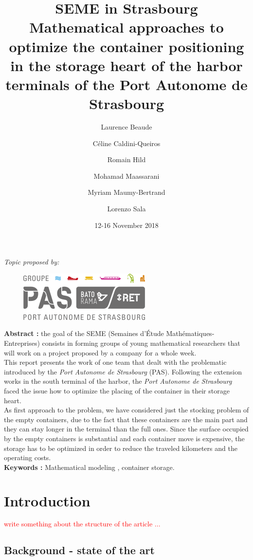 \documentclass{article}
\title{\textbf{SEME in Strasbourg}\\[15pt] 
	Mathematical approaches to optimize the container positioning in the storage heart of the harbor terminals of the Port Autonome de Strasbourg}
\author[1]{Laurence Beaude}
\author[2]{Céline Caldini-Queiros }
\author[2]{Romain Hild}
\author[2]{Mohamad Maassarani}
\author[2]{Myriam Maumy-Bertrand}
\author[2]{Lorenzo Sala}
\affil[1]{Universit\'e C\^ote d'Azur, CNRS, INRIA COFFEE, 
	Laboratoire J.A. Dieudonn\'e, 
	Parc Valrose, 06108 Nice cedex 02, France.}
\affil[2]{Universit\'e de Strasbourg, IRMA, UMR 7501, 67000 Strasbourg, France.}
\date{12-16 November 2018}
\newcommand{\ls}[1]{\textcolor{red}{#1}}
\newcommand{\PAS}{\emph{Port Autonome de Strasbourg }}
\begin{document}
\maketitle

\begin{center}
\textit{Topic proposed by:} \vspace{-3mm}
\begin{figure}[h!]
	\centering
	\includegraphics[width=0.3\linewidth]{images/logo-pas}
\end{figure}
\end{center}

\noindent
\textbf{Abstract :} the goal of the SEME (Semaines d'\'Etude Mathématiques-Entreprises) consists in forming groups of young mathematical researchers that will work on a project proposed by a company for a whole week. \\
This report presents the work of one team that dealt with the problematic introduced by the \PAS (PAS).
Following the extension works in the south terminal of the harbor, the \PAS faced the issue how to optimize the placing of the container in their storage heart. \\
As first approach to the problem, we have considered just the stocking problem of the empty containers, due to the fact that these containers are the main part and they can stay longer in the terminal than the full ones.
Since the surface occupied by the empty containers is substantial and each container move is expensive, the storage has to be optimized in order to reduce the traveled kilometers and the operating costs. \\

\noindent
\textbf{Keywords :} Mathematical modeling , container storage.

\section{Introduction}

\ls{write something about the structure of the article ... }

\subsection{Background - state of the art}
\end{document}
